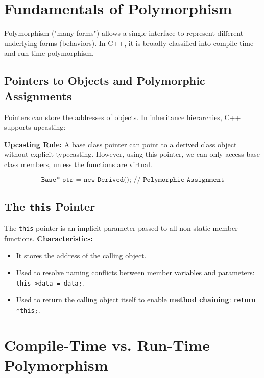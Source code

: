 \documentclass[12pt,a4paper]{article}
\begin{document}
\section{Fundamentals of Polymorphism}

Polymorphism ("many forms") allows a single interface to represent different underlying forms (behaviors). In C++, it is broadly classified into compile-time and run-time polymorphism.

\subsection{Pointers to Objects and Polymorphic Assignments}
Pointers can store the addresses of objects. In inheritance hierarchies, C++ supports upcasting:
\begin{tcolorbox}[defbox]
\textbf{Upcasting Rule:} A base class pointer can point to a derived class object without explicit typecasting. However, using this pointer, we can only access base class members, unless the functions are virtual.
\end{tcolorbox}
\begin{equation}
  \texttt{Base* ptr = new Derived(); // Polymorphic Assignment}
\end{equation}

\subsection{The \texorpdfstring{\texttt{this}}{this} Pointer}
The \texttt{this} pointer is an implicit parameter passed to all non-static member functions.
\textbf{Characteristics:}
\begin{itemize}[leftmargin=*, itemsep=2pt]
  \item It stores the address of the calling object.
  \item Used to resolve naming conflicts between member variables and parameters: \texttt{this->data = data;}.
  \item Used to return the calling object itself to enable \textbf{method chaining}: \texttt{return *this;}.
\end{itemize}

\section{Compile-Time vs. Run-Time Polymorphism}
\end{document}
